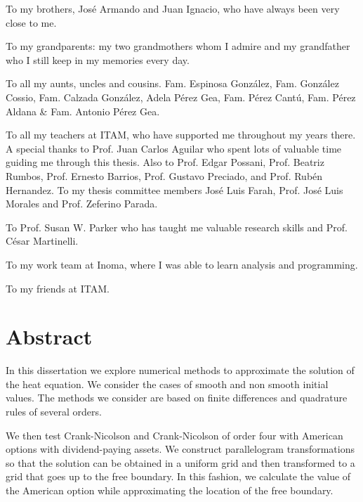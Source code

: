 \documentclass[11pt,letterpaper]{book}
\theoremstyle{definition}
\begin{document}
To my brothers, Jos\'e Armando and Juan Ignacio, who have always been very close to me. 

To my grandparents: my two grandmothers whom I admire and my grandfather who I still keep in my memories every day. 

To all my aunts, uncles and cousins. Fam. Espinosa Gonz\'alez, Fam. Gonz\'alez Cossio, Fam. Calzada Gonz\'alez, Adela P\'erez Gea, Fam. P\'erez Cant\'u, Fam. P\'erez Aldana \& Fam. Antonio P\'erez Gea.

To all my teachers at ITAM, who have supported me throughout my years there. A special thanks to Prof. Juan Carlos Aguilar who spent lots of valuable time guiding me through this thesis. Also to Prof. Edgar Possani, Prof. Beatriz Rumbos, Prof. Ernesto Barrios, Prof. Gustavo Preciado, and Prof.  Rub\'en Hernandez. To my thesis committee members Jos\'e Luis Farah, Prof. Jos\'e Luis Morales and Prof. Zeferino Parada.

To Prof. Susan W. Parker who has taught me valuable research skills and Prof. C\'esar Martinelli.

To my work team at Inoma, where I was able to learn analysis and programming.

To my friends at ITAM.




\chapter*{Abstract}

In this dissertation we explore numerical methods to approximate the solution of the heat equation. We consider the cases of smooth and non smooth initial values. The methods we consider are based on finite differences and quadrature rules of several orders.

We then test Crank-Nicolson and Crank-Nicolson of order four with American options with dividend-paying assets. We construct parallelogram transformations so that the solution can be obtained in a uniform grid and then transformed to a grid that goes up to the free boundary. In this fashion, we calculate the value of the American option while approximating the location of the free boundary. 



\tableofcontents

\listoffigures

\listoftables


\mainmatter


\end{document}
